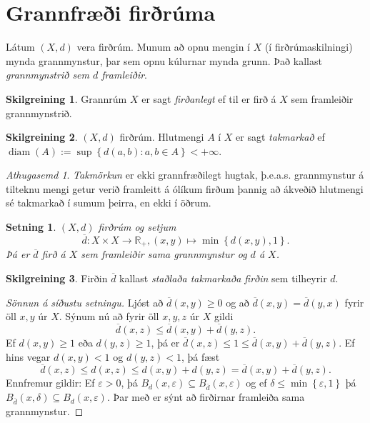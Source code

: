 \documentclass[a4paper,icelandic]{book}
\theoremstyle{definition}
\newtheorem{skilgr}{Skilgreining}[section]
\theoremstyle{plain}
\newtheorem{setn}{Setning}[section]
\theoremstyle{remark}
\newtheorem*{ath}{Athugasemd}
\newcommand{\R}{\mathbb{R}} %
\DeclareMathOperator{\diam}{diam} %
\begin{document}
\section{Grannfræði firðrúma}
Látum $(X,d)$ vera firðrúm. Munum að opnu mengin í $X$ (í firðrúmaskilningi)
mynda grannmynstur, þar sem opnu kúlurnar mynda grunn. Það kallast
\emph{grannmynstrið sem $d$ framleiðir}.
\begin{skilgr}
  Grannrúm $X$ er sagt \emph{firðanlegt} ef til er
  firð á $X$ sem framleiðir grannmynstrið.
\end{skilgr}
\begin{skilgr}
  $(X,d)$ firðrúm. Hlutmengi $A$ í $X$ er sagt \emph{takmarkað} ef $\diam(A) := \sup\left\{ d(a,b):a,b\in A
  \right\}<+\infty$.
\end{skilgr}
\begin{ath}
  \emph{Takmörkun} er ekki grannfræðilegt hugtak, þ.e.a.s. grannmynstur á
  tilteknu mengi getur verið framleitt á ólíkum firðum þannig að ákveðið
  hlutmengi sé takmarkað í sumum þeirra, en ekki í öðrum.
\end{ath}
\begin{setn}
  $(X,d)$ firðrúm og setjum\[
  \overline d: X\times X\to\R_+, (x,y)\mapsto\min\left\{ d(x,y) , 1 \right\}.
  \]
  Þá er $\overline d$ firð á $X$ sem framleiðir sama grannmynstur og $d$ á
  $X$.
\end{setn}
\begin{skilgr}
  Firðin $\overline d$ kallast \emph{staðlaða takmarkaða firðin} sem tilheyrir $d$.
\end{skilgr}
\begin{proof}
  [Sönnun á síðustu setningu]
  Ljóst að $\overline d(x,y) \geq 0$ og að $\overline d(x,y) = \overline d(y,x)$
  fyrir öll $x,y$ úr $X$. Sýnum nú að fyrir öll $x,y,z$ úr $X$ gildi\[
  \overline d(x,z)\leq \overline d(x,y)+ \overline d(y,z).
  \]
  Ef $d(x,y)\geq 1$ eða $d(y,z)\geq 1$, þá er $\overline d(x,z)\leq 1 \leq
  \overline d(x,y) + \overline d(y,z)$. Ef hins vegar $d(x,y) < 1$ og
  $d(y,z)<1$, þá fæst\[
  \overline d(x,z)
  \leq d(x,z)
  \leq d(x,y) + d(y,z)
  = \overline d(x,y) + \overline d(y,z).
  \]
  Ennfremur gildir: Ef $\varepsilon > 0$, þá $B_d(x,\varepsilon)\subseteq
  B_{\overline d}(x,\varepsilon)$ og ef $\delta \leq \min\left\{ \varepsilon,1
  \right\}$ þá $B_{\overline d}(x,\delta)\subseteq B_d(x,\varepsilon)$. Þar með
  er sýnt að firðirnar framleiða sama grannmynstur.
\end{proof}
\end{document}
